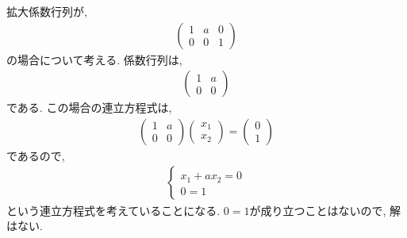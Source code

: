 \begin{example}
    \label{eg:eq:reduced:2}
  拡大係数行列が,
  \begin{align*}
    \begin{pmatrix}
      1&a&0\\0&0&1
    \end{pmatrix}
  \end{align*}
  の場合について考える.
  係数行列は,
  \begin{align*}
    \begin{pmatrix}
      1&a\\0&0
    \end{pmatrix}
  \end{align*}
  である.
  この場合の連立方程式は,
  \begin{align*}
    \begin{pmatrix}
      1&a\\0&0
    \end{pmatrix}
    \begin{pmatrix}x_1\\x_2\end{pmatrix}
      =
      \begin{pmatrix}
        0\\1
      \end{pmatrix}
  \end{align*}
  であるので,
  \begin{align*}
    \begin{cases}
      x_1+ax_2=0\\
      0=1
    \end{cases}
  \end{align*}
  という連立方程式を考えていることになる.
  $0=1$が成り立つことはないので,
  解はない.
\end{example}

